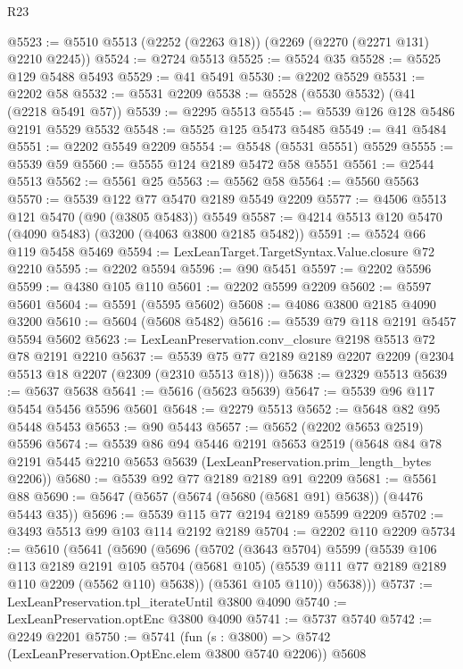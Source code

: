 \begin{lexlean}{R23}
\begin{coremodule}
@5523 := @5510 @5513 (@2252 (@2263 @18)) (@2269 (@2270 (@2271 @131) @2210 @2245))
@5524 := @2724 @5513
@5525 := @5524 @35
@5528 := @5525 @129 @5488 @5493
@5529 := @41 @5491
@5530 := @2202 @5529
@5531 := @2202 @58
@5532 := @5531 @2209
@5538 := @5528 (@5530 @5532) (@41 (@2218 @5491 @57))
@5539 := @2295 @5513
@5545 := @5539 @126 @128 @5486 @2191 @5529 @5532
@5548 := @5525 @125 @5473 @5485
@5549 := @41 @5484
@5551 := @2202 @5549 @2209
@5554 := @5548 (@5531 @5551) @5529
@5555 := @5539 @59
@5560 := @5555 @124 @2189 @5472 @58 @5551
@5561 := @2544 @5513
@5562 := @5561 @25
@5563 := @5562 @58
@5564 := @5560 @5563
@5570 := @5539 @122 @77 @5470 @2189 @5549 @2209
@5577 := @4506 @5513 @121 @5470 (@90 (@3805 @5483)) @5549
@5587 := @4214 @5513 @120 @5470 (@4090 @5483) (@3200 (@4063 @3800 @2185 @5482))
@5591 := @5524 @66 @119 @5458 @5469
@5594 := LexLeanTarget.TargetSyntax.Value.closure @72 @2210
@5595 := @2202 @5594
@5596 := @90 @5451
@5597 := @2202 @5596
@5599 := @4380 @105 @110
@5601 := @2202 @5599 @2209
@5602 := @5597 @5601
@5604 := @5591 (@5595 @5602)
@5608 := @4086 @3800 @2185 @4090 @3200
@5610 := @5604 (@5608 @5482)
@5616 := @5539 @79 @118 @2191 @5457 @5594 @5602
@5623 := LexLeanPreservation.conv_closure @2198 @5513 @72 @78 @2191 @2210
@5637 := @5539 @75 @77 @2189 @2189 @2207 @2209 (@2304 @5513 @18 @2207 (@2309 (@2310 @5513 @18)))
@5638 := @2329 @5513
@5639 := @5637 @5638
@5641 := @5616 (@5623 @5639)
@5647 := @5539 @96 @117 @5454 @5456 @5596 @5601
@5648 := @2279 @5513
@5652 := @5648 @82 @95 @5448 @5453
@5653 := @90 @5443
@5657 := @5652 (@2202 @5653 @2519) @5596
@5674 := @5539
    @86
    @94
    @5446
    @2191
    @5653
    @2519
    (@5648 @84 @78 @2191 @5445 @2210 @5653 @5639 (LexLeanPreservation.prim_length_bytes @2206))
@5680 := @5539 @92 @77 @2189 @2189 @91 @2209
@5681 := @5561 @88
@5690 := @5647 (@5657 (@5674 (@5680 (@5681 @91) @5638)) (@4476 @5443 @35))
@5696 := @5539 @115 @77 @2194 @2189 @5599 @2209
@5702 := @3493 @5513 @99 @103 @114 @2192 @2189
@5704 := @2202 @110 @2209
@5734 := @5610
    (@5641
      (@5690
        (@5696
          (@5702
            (@3643 @5704)
            @5599
            (@5539
              @106
              @113
              @2189
              @2191
              @105
              @5704
              (@5681 @105)
              (@5539 @111 @77 @2189 @2189 @110 @2209 (@5562 @110) @5638))
            (@5361 @105 @110))
          @5638)))
@5737 := LexLeanPreservation.tpl_iterateUntil @3800 @4090
@5740 := LexLeanPreservation.optEnc @3800 @4090
@5741 := @5737 @5740
@5742 := @2249 @2201
@5750 := @5741 (fun (s : @3800) => @5742 (LexLeanPreservation.OptEnc.elem @3800 @5740 @2206)) @5608

\end{coremodule}
\end{lexlean}
